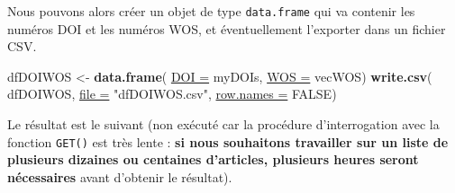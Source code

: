 \documentclass[twoside,symmetric]{book}
\newenvironment{Shaded}{}{}
\newcommand{\ControlFlowTok}[1]{\textbf{#1}}
\newcommand{\DataTypeTok}[1]{\underline{#1}}
\newcommand{\DecValTok}[1]{#1}
\newcommand{\KeywordTok}[1]{\textbf{#1}}
\newcommand{\NormalTok}[1]{#1}
\newcommand{\OperatorTok}[1]{#1}
\newcommand{\OtherTok}[1]{#1}
\newcommand{\StringTok}[1]{#1}
\begin{document}
\begin{Shaded}
\end{Shaded}

Nous pouvons alors créer un objet de type \texttt{data.frame} qui va contenir les numéros DOI et les numéros WOS, et éventuellement l'exporter dans un fichier CSV.

\begin{Shaded}
\begin{Highlighting}[]
\NormalTok{dfDOIWOS <-}\StringTok{ }\KeywordTok{data.frame}\NormalTok{(}
  \DataTypeTok{DOI =}\NormalTok{ myDOIs, }
  \DataTypeTok{WOS =}\NormalTok{ vecWOS)}
\KeywordTok{write.csv}\NormalTok{(}
\NormalTok{  dfDOIWOS, }
  \DataTypeTok{file =} \StringTok{"dfDOIWOS.csv"}\NormalTok{, }
  \DataTypeTok{row.names =} \OtherTok{FALSE}\NormalTok{)}
\end{Highlighting}
\end{Shaded}

Le résultat est le suivant (non exécuté car la procédure d'interrogation avec la fonction \texttt{GET()} est très lente : \textbf{si nous souhaitons travailler sur un liste de plusieurs dizaines ou centaines d'articles, plusieurs heures seront nécessaires} avant d'obtenir le résultat).
\end{document}
